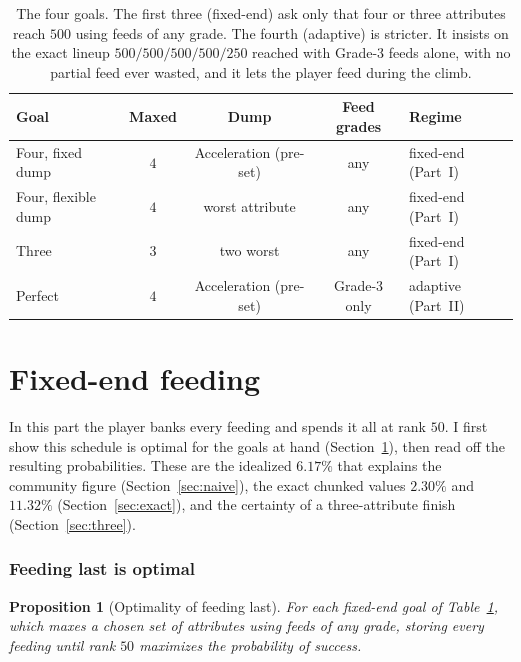 \documentclass[11pt]{article}
\newtheorem{proposition}{Proposition}
\theoremstyle{remark}
\begin{document}
\begin{table}[h]
\centering
\begin{tabular}{@{}lcccl@{}}
\toprule
Goal & Maxed & Dump & Feed grades & Regime \\
\midrule
Four, fixed dump   & $4$ & Acceleration (pre-set) & any        & fixed-end (Part~I) \\
Four, flexible dump& $4$ & worst attribute        & any        & fixed-end (Part~I) \\
Three              & $3$ & two worst              & any        & fixed-end (Part~I) \\
Perfect            & $4$ & Acceleration (pre-set) & Grade-3 only & adaptive (Part~II) \\
\bottomrule
\end{tabular}
\caption{The four goals. The first three (fixed-end) ask only that four or three
attributes reach $500$ using feeds of any grade. The fourth (adaptive) is stricter.
It insists on the exact lineup $500/500/500/500/250$ reached with Grade-3 feeds
alone, with no partial feed ever wasted, and it lets the player feed during the climb.}
\label{tab:goals}
\end{table}

\part{Fixed-end feeding}

In this part the player banks every feeding and spends it all at rank $50$. I
first show this schedule is optimal for the goals at hand
(Section~\ref{sec:feedlast}), then read off the resulting probabilities. These are
the idealized $6.17\%$ that explains the community figure (Section~\ref{sec:naive}),
the exact chunked values $2.30\%$ and $11.32\%$ (Section~\ref{sec:exact}), and the
certainty of a three-attribute finish (Section~\ref{sec:three}).

\section{Feeding last is optimal}\label{sec:feedlast}

\begin{proposition}[Optimality of feeding last]\label{prop:feedlast}
For each fixed-end goal of Table~\ref{tab:goals}, which maxes a chosen set of
attributes using feeds of any grade, storing every feeding until rank $50$ maximizes
the probability of success.
\end{proposition}
\end{document}
